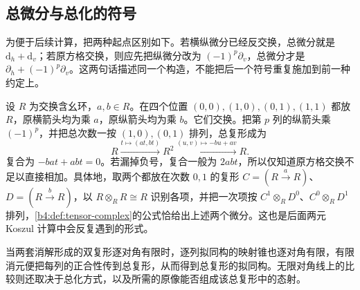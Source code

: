 \subsection{总微分与总化的符号}
\label{b4:subsec:0604:04}

为便于后续计算，把两种起点区别如下。若横纵微分已经反交换，总微分就是 \(\mathrm{d}_h+\mathrm{d}_v\)；若原方格交换，则应先把纵微分改为 \((-1)^p\partial_v\)，总微分才是 \(\partial_h+(-1)^p\partial_v\)。这两句话描述同一个构造，不能把后一个符号重复施加到前一种约定上。

\begin{example}\label{b4:exm:double-square-sign}
	设 \(R\) 为交换含幺环，\(a,b\in R\)。在四个位置 \((0,0),(1,0),(0,1),(1,1)\) 都放 \(R\)，原横箭头均为乘 \(a\)，原纵箭头均为乘 \(b\)。它们交换。把第 \(p\) 列的纵箭头乘 \((-1)^p\)，并把总次数一按 \((1,0),(0,1)\) 排列，总复形成为
	\[
		R\xrightarrow{t\mapsto(at,bt)}R^2 \xrightarrow{(u,v)\mapsto-bu+av}R.
	\]
	复合为 \(-bat+abt=0\)。若漏掉负号，复合一般为 \(2abt\)，所以仅知道原方格交换不足以直接相加。具体地，取两个都放在次数 \(0,1\) 的复形 \(C=(R\xrightarrow{a}R)\)、\(D=(R\xrightarrow{b}R)\)，以 \(R\otimes_RR\cong R\) 识别各项，并把一次项按 \(C^1\otimes_R D^0\)、\(C^0\otimes_R D^1\) 排列，\cref{b4:def:tensor-complex}的公式恰给出上述两个微分。这也是后面两元 Koszul 计算中会反复遇到的形式。
\end{example}

当两套消解形成的双复形逐对角有限时，逐列拟同构的映射锥也逐对角有限，有限消元便把每列的正合性传到总复形，从而得到总复形的拟同构。无限对角线上的比较则还取决于总化方式，以及所需的原像能否组成该总复形中的态射。
